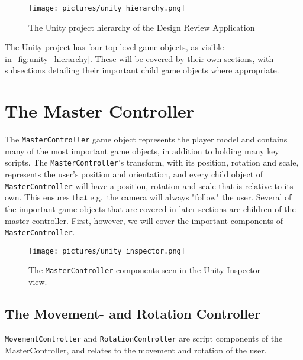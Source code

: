 \begin{figure}%
	\texttt{[image: pictures/unity\_hierarchy.png]}
	\caption[The Unity project hierarchy of the Design Review Application]{The Unity project hierarchy of the Design Review Application}
	\label{fig:unity_hierarchy}
\end{figure} 

The Unity project has four top-level game objects, as visible in~\vref{fig:unity_hierarchy}. 
These will be covered by their own sections, with subsections detailing their important child game objects where appropriate.


\section{The Master Controller}
The \texttt{MasterController} game object represents the player model and contains many of the most important game objects, in addition to
holding many key scripts. The \texttt{MasterController}'s transform, with its position, rotation and scale, represents the user's position and orientation, 
and every child object of \texttt{MasterController} will have a position, rotation and scale that is relative to its own. This ensures
that e.g.~the camera will always "follow" the user. Several of the important game objects that are covered in later sections are children of 
the master controller. First, however, we will cover the important components of \texttt{MasterController}.

\begin{figure}%
	\texttt{[image: pictures/unity\_inspector.png]}
	\caption[The \texttt{MasterController} components]{The \texttt{MasterController} components seen in the Unity Inspector view.}
	\label{fig:unity_inspector}
\end{figure} 

\subsection{The Movement- and Rotation Controller}
\texttt{MovementController} and \texttt{RotationController} are script components of the MasterController, and relates to the movement and rotation of the user.

